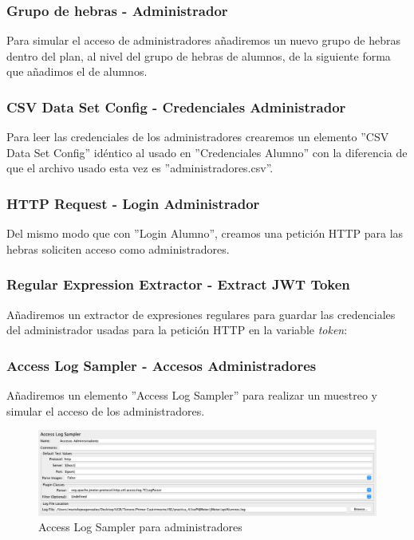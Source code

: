 \subsubsection{Grupo de hebras - Administrador}
Para simular el acceso de administradores añadiremos un nuevo grupo de hebras dentro del plan, al nivel del grupo de hebras de alumnos, de la siguiente forma
que añadimos el de alumnos.

\subsubsection{CSV Data Set Config - Credenciales Administrador}
Para leer las credenciales de los administradores crearemos un elemento ''CSV Data Set Config'' idéntico al usado en ''Credenciales Alumno'' con la diferencia de 
que el archivo usado esta vez es ''administradores.csv''.

\subsubsection{HTTP Request - Login Administrador}
Del mismo modo que con ''Login Alumno'', creamos una petición HTTP para las hebras soliciten acceso como administradores. 

\subsubsection{Regular Expression Extractor - Extract JWT Token}
Añadiremos un extractor de expresiones regulares para guardar las credenciales del administrador usadas para la petición HTTP en la variable \emph{token}:

\subsubsection{Access Log Sampler - Accesos Administradores}
Añadiremos un elemento ''Access Log Sampler'' para realizar un muestreo y simular el acceso de los administradores.
\begin{figure}[H]
    \centering  
    \includegraphics[scale=0.33]{images/access_administrador.png}
    \caption{Access Log Sampler para administradores}
    \label{fig:access_administrador}
\end{figure}

